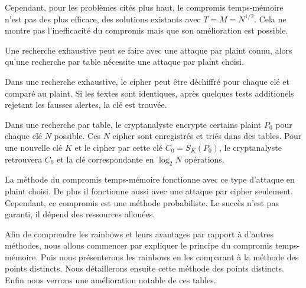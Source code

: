 		\bigskip

		Cependant, pour les problèmes cités plus haut, le compromis temps-mémoire n'est pas des plus efficace, des solutions existants avec $T = M = N^{1/2}$. Cela ne montre pas l'inefficacité du compromis mais que son amélioration est possible.

		\bigskip

		Une recherche exhaustive peut se faire avec une attaque par \gls{plaint} connu, alors qu'une recherche par table nécessite une attaque par \gls{plaint} choisi.

		\bigskip

		Dans une recherche exhaustive, le \gls{cipher} peut être déchiffré pour chaque clé et comparé au \gls{plaint}. Si les textes sont identiques, après quelques tests additionels rejetant les fausses alertes, la clé est trouvée.

		\bigskip

		Dans une recherche par table, le cryptanalyste encrypte certains \gls{plaint} $P_0$ pour chaque clé $N$ possible. Ces $N$ \gls{cipher} sont enregistrés et triés dans des tables. Pour une nouvelle clé $K$ et le \gls{cipher} par cette clé $C_0 = S_K(P_0)$, le cryptanalyste retrouvera $C_0$ et la clé correspondante en $\log_2 N$ opérations.

		\bigskip

		La méthode du compromis temps-mémoire fonctionne avec ce type d'attaque en \gls{plaint} choisi. De plus il fonctionne aussi avec une attaque par \gls{cipher} seulement. Cependant, ce compromis est une méthode probabiliste. Le succès n'est pas garanti, il dépend des ressources allouées.

		\bigskip

		Afin de comprendre les \glspl{rainbow} et leurs avantages par rapport à d'autres méthodes, nous allons commencer par expliquer le principe du compromis temps-mémoire. Puis nous présenterons les \glspl{rainbow} en les comparant à la méthode des points distincts. Nous détaillerons ensuite cette méthode des points distincts. Enfin nous verrons une amélioration notable de ces tables.

\endinput{}
